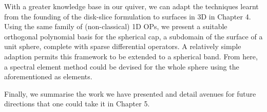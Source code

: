 With a greater knowledge base in our quiver, we can adapt the techniques learnt from the founding of the disk-slice formulation to surfaces in 3D in Chapter 4. Using the same family of (non-classical) 1D OPs, we present a suitable orthogonal polynomial basis for the spherical cap, a subdomain of the surface of a unit sphere, complete with sparse differential operators. A relatively simple adaption permits this framework to be extended to a spherical band. From here, a spectral element method could be devised for the whole sphere using the aforementioned as elements.

Finally, we summarise the work we have presented and detail avenues for future directions that one could take it in Chapter 5.
